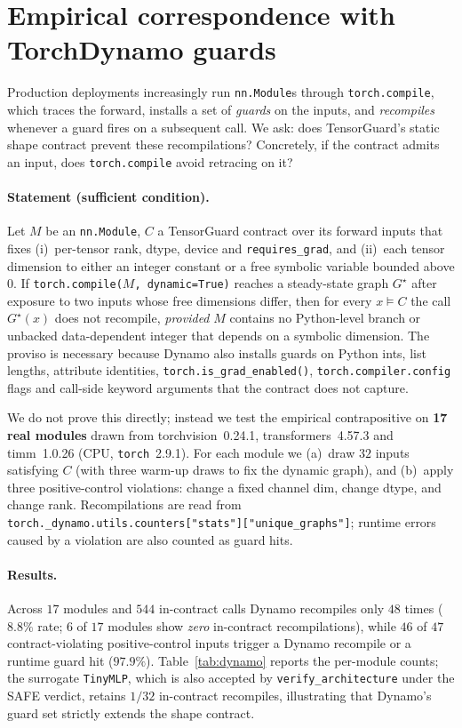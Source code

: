 \section{Empirical correspondence with TorchDynamo guards}
\label{sec:dynamo}

Production deployments increasingly run \texttt{nn.Module}s through
\texttt{torch.compile}, which traces the forward, installs a set of
\emph{guards} on the inputs, and \emph{recompiles} whenever a guard fires
on a subsequent call. We ask: does TensorGuard's static shape contract
prevent these recompilations? Concretely, if the contract admits an
input, does \texttt{torch.compile} avoid retracing on it?

\paragraph{Statement (sufficient condition).}
Let $M$ be an \texttt{nn.Module}, $C$ a TensorGuard contract over its
forward inputs that fixes (i)~per-tensor rank, dtype, device and
\texttt{requires\_grad}, and (ii)~each tensor dimension to either an integer
constant or a free symbolic variable bounded above $0$. If
\texttt{torch.compile($M$, dynamic=True)} reaches a steady-state graph
$G^\star$ after exposure to two inputs whose free dimensions differ, then
for every $x\models C$ the call $G^\star(x)$ does not recompile,
\emph{provided} $M$ contains no Python-level branch or unbacked
data-dependent integer that depends on a symbolic dimension. The proviso
is necessary because Dynamo also installs guards on Python ints, list
lengths, attribute identities, \texttt{torch.is\_grad\_enabled()},
\texttt{torch.compiler.config} flags and call-side keyword arguments that
the contract does not capture.

We do not prove this directly; instead we test the empirical contrapositive
on \textbf{17 real modules} drawn from torchvision~0.24.1, transformers~4.57.3
and timm~1.0.26 (CPU, \texttt{torch}~2.9.1). For each module we (a)~draw
$32$ inputs satisfying $C$ (with three warm-up draws to fix the dynamic
graph), and (b)~apply three positive-control violations: change a fixed
channel dim, change dtype, and change rank. Recompilations are read from
\texttt{torch.\_dynamo.utils.counters["stats"]["unique\_graphs"]}; runtime
errors caused by a violation are also counted as guard hits.

\paragraph{Results.}
Across $17$ modules and $544$ in-contract calls Dynamo recompiles only
$48$ times ($8.8\%$ rate; $6$ of $17$ modules show \emph{zero} in-contract
recompilations), while $46$ of $47$ contract-violating positive-control
inputs trigger a Dynamo recompile or a runtime guard hit ($97.9\%$).
Table~\ref{tab:dynamo} reports the per-module counts; the surrogate
\texttt{TinyMLP}, which is also accepted by \texttt{verify\_architecture}
under the SAFE verdict, retains $1/32$ in-contract recompiles, illustrating
that Dynamo's guard set strictly extends the shape contract.

